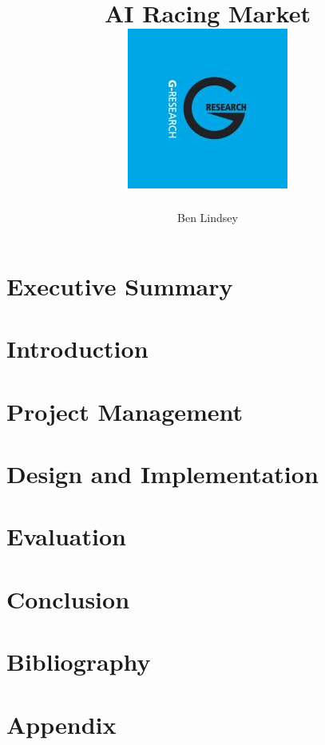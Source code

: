 \documentclass[11pt]{report}
\title{	
  {\huge AI Racing Market}\\[2em]
  {\includegraphics[scale=0.7]{G-Research.jpg}}
}
\author{Ben Lindsey}
\begin{document}
\maketitle

\tableofcontents

\chapter{Executive Summary}


\chapter{Introduction}


\chapter{Project Management}


\chapter{Design and Implementation}


\chapter{Evaluation}


\chapter{Conclusion}


\chapter{Bibliography}
\printbibliography

\appendix
\chapter{Appendix}

\end{document}
